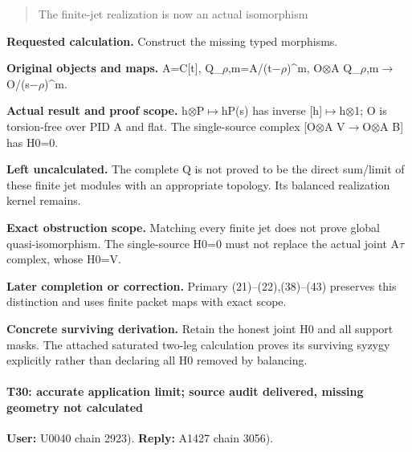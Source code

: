 \begin{quote}
The finite-jet realization is now an actual isomorphism
\end{quote}

\textbf{Requested calculation.} Construct the missing typed morphisms.

\textbf{Original objects and maps.} A=C{[}t{]},
Q\_\allowbreak{}\ensuremath{ρ}\allowbreak{},m=A/(t\allowbreak{}\ensuremath{−}\allowbreak{}\allowbreak{}\ensuremath{ρ}\allowbreak{})\textasciicircum{}m,
O\allowbreak{}\ensuremath{⊗}\allowbreak{}A
Q\_\allowbreak{}\ensuremath{ρ}\allowbreak{},m\allowbreak{}\ensuremath{→}\allowbreak{}O/(s\allowbreak{}\ensuremath{−}\allowbreak{}\allowbreak{}\ensuremath{ρ}\allowbreak{})\textasciicircum{}m.

\textbf{Actual result and proof scope.}
h\allowbreak{}\ensuremath{⊗}\allowbreak{}P\allowbreak{}\ensuremath{↦}\allowbreak{}hP(s)
has inverse
[h]\allowbreak{}\ensuremath{↦}\allowbreak{}h\allowbreak{}\ensuremath{⊗}\allowbreak{}1;
O is torsion-free over PID A and flat. The single-source complex
[O\allowbreak{}\ensuremath{⊗}\allowbreak{}A
V\allowbreak{}\ensuremath{→}\allowbreak{}O\allowbreak{}\ensuremath{⊗}\allowbreak{}A
B{]} has H0=0.

\textbf{Left uncalculated.} The complete Q is not proved to be the
direct sum/limit of these finite jet modules with an appropriate
topology. Its balanced realization kernel remains.

\textbf{Exact obstruction scope.} Matching every finite jet does not
prove global quasi-isomorphism. The single-source H0=0 must not replace
the actual joint A\allowbreak{}\ensuremath{τ}\allowbreak{} complex,
whose H0=V.

\textbf{Later completion or correction.} Primary (21)--(22),(38)--(43)
preserves this distinction and uses finite packet maps with exact scope.

\textbf{Concrete surviving derivation.} Retain the honest joint H0 and
all support masks. The attached saturated two-leg calculation proves its
surviving syzygy explicitly rather than declaring all H0 removed by
balancing.

\paragraph{T30: accurate application limit; source audit delivered,
missing geometry not
calculated}\label{t30-accurate-application-limit-source-audit-delivered-missing-geometry-not-calculated}

\textbf{User:} U0040
\protect{} chain 2923).
\textbf{Reply:} A1427
\protect{} chain 3056).

